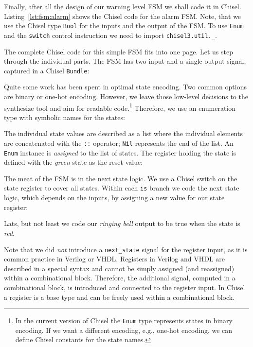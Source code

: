 \documentclass[%
    10pt,
    headinclude, footexclude,
    openright, %
    notitlepage,
    cleardoubleempty,
    headsepline,
    pointlessnumbers,
    bibtotoc, idxtotoc,
    ]{scrbook}
\newcommand{\code}[1]{{\small{\texttt{#1}}}}
\begin{document}
Finally, after all the design of our warning level FSM we shall code it in Chisel.
Listing~\ref{lst:fsm:alarm} shows the Chisel code for the alarm FSM.
Note, that we use the Chisel type \code{Bool} for the inputs and the
output of the FSM.
To use \code{Enum} and the \code{switch} control instruction we need to
import \code{chisel3.util.\_}.


The complete Chisel code for this simple FSM fits into one page.
Let us step through the individual parts.
The FSM has two input and a single output signal, captured in a Chisel \code{Bundle}:
%


\noindent Quite some work has been spent in optimal state encoding. Two common options
are binary or one-hot encoding. However, we leave those low-level decisions to
the synthesize tool and aim for readable code.\footnote{In the current version
of Chisel the \code{Enum} type represents states in binary encoding.
If we want a different encoding, e.g., one-hot encoding, we can define Chisel
constants for the state names.}
Therefore, we use an enumeration type with symbolic names for the states:


\noindent The individual state values are described as a list where the individual
elements are concatenated with the \code{::} operator; \code{Nil} represents
the end of the list. An \code{Enum} instance is \emph{assigned} to the list of states.
The register holding the state is defined with the \emph{green} state as the reset value:


\noindent The meat of the FSM is in the next state logic. We use a Chisel switch on the
state register to cover all states. Within each \code{is} branch we code the next state
logic, which depends on the inputs, by assigning a new value for our state register:


\noindent Lats, but not least we code our \emph{ringing bell} output to be true when
the state is \emph{red}.


Note that we did \emph{not} introduce a \code{next\_state} signal for the register input,
as it is common practice in Verilog or VHDL.
Registers in Verilog and VHDL are described in a special syntax and cannot
be simply assigned (and reassigned) within a combinational block.
Therefore, the additional signal, computed in a combinational block, is
introduced and connected to the register input.
In Chisel a register is a base type and can be freely used within a combinational block.
\end{document}
